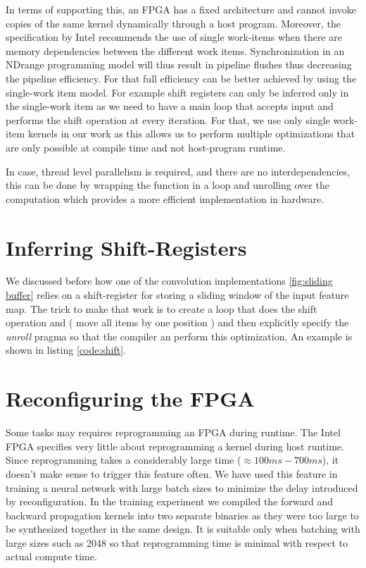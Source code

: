 In terms of supporting this, an FPGA has a fixed architecture and cannot invoke copies of the same kernel dynamically through a host program. Moreover, the specification by Intel recommends the use of single work-items when there are memory dependencies between the different work items. Synchronization in an NDrange programming model will thus result in pipeline flushes thus decreasing the pipeline efficiency. For that full efficiency can be better achieved by using the single-work item model. For example shift registers can only be inferred only in the single-work item as we need to have a main loop that accepts input and performs the shift operation at every iteration. For that, we use only single work-item kernels in our work as this allows us to perform multiple optimizations that are only possible at compile time and not host-program runtime. 

In case, thread level parallelism is required, and there are no interdependencies, this can be done by wrapping the function in a loop and unrolling over the computation which provides a more efficient implementation in hardware. 

\section{Inferring Shift-Registers}

We discussed before how one of the convolution implementations \ref{fig:sliding buffer} relies on a shift-register for storing a sliding window of the input feature map. The trick to make that work is to create a loop that does the shift operation and ( move all items by one position ) and then explicitly specify the \emph{unroll} pragma so that the compiler an perform this optimization. An example is shown in listing \ref{code:shift}.

\newpage

 \label{code:shift} 

\section{Reconfiguring the FPGA}

Some tasks may requires reprogramming an FPGA during runtime. The Intel FPGA specifies very little about reprogramming a kernel during host runtime. Since reprogramming takes a considerably large time ($\approx100ms-700ms $), it doesn’t make sense to trigger this feature often. We have used this feature in training a neural network with large batch sizes to minimize the delay introduced by reconfiguration. In the training experiment we compiled the forward and backward propagation kernels into two separate binaries as they were too large to be synthesized together in the same design. It is suitable only when batching with large sizes such as 2048 so that reprogramming time is minimal with respect to actual compute time. 


